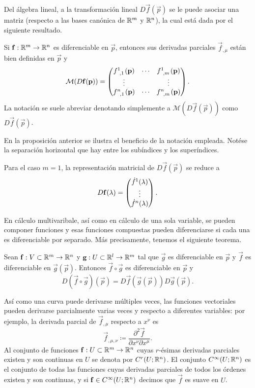 Del álgebra lineal, a la transformación lineal $D\vec f(\vec p)$ se le puede asociar una matriz (respecto a las bases canónica de $\mathbb R^m$ y $\mathbb R^n$), la cual está dada por el siguiente resultado.
\begin{proposition}\label{prop: jacobian}
	Si $\mathbf f: \mathbb R^m \to \mathbb R^n$ es diferenciable en $\vec p$, entonces sus derivadas parciales $\vec f_{,\mu}$ están bien definidas en $\vec p$ y
	\begin{equation}
		\mathcal M(D\vec f(\vec p)) = \Matrix{
			f\indices{^1_{,1}}(\vec p) & \dotsb & f\indices{^1_{,m}}(\vec p)\\
			\vdots & & \vdots\\
			f\indices{^n_{,1}}(\vec p) & \dotsb & f\indices{^n_{,m}}(\vec p)
		}.
	\end{equation}
	La notación se suele abreviar denotando simplemente a $\mathcal M(D\vec f(\vec p))$  como $D\vec f(\vec p) $.
\end{proposition}
En la proposición anterior se ilustra el beneficio de la notación empleada.
Notése la separación horizontal que hay entre los subíndices y los superíndices.
\begin{remark}
	Para el caso $m = 1$, la representación matricial de $D\vec f(\vec p)$ se reduce a
	\begin{equation}
		D\mathbf f(\lambda) = \begin{pmatrix}\dot f^1(\lambda) \\ \vdots \\ \dot f^n(\lambda)\end{pmatrix}.
	\end{equation}
\end{remark}

En cálculo multivaribale, así como en cálculo de una sola variable, se pueden componer funciones y esas funciones compuestas pueden diferenciarse si cada una es diferenciable por separado. Más precisamente, tenemos el siguiente teorema.
\begin{theorem}\label{teo: chain}
	Sean $\mathbf f : V \subset \mathbb R^m \to \mathbb R^n$ y $\mathbf g : U \subset \mathbb R^l \to \mathbb R^m$ tal que $\vec g$ es diferenciable en $\vec p$ y $\vec f$ es diferenciable en $\vec g(\vec p)$. Entonces $\vec f \circ \vec g$ es diferenciable en $\vec p$ y
	\begin{equation}
		D(\vec f \circ \vec g)(\vec p) = D\vec f(\vec g(\vec p)) D\vec g(\vec p).
	\end{equation}
\end{theorem}

Así como una curva puede derivarse múltiples veces, las funciones vectoriales pueden derivarse parcialmente varias veces y respecto a diferentes variables: por ejemplo, la derivada parcial de $\vec f_{,\mu}$ respecto a $x^\nu$ es
\begin{equation}
	\vec f_{,\mu,\nu} \coloneqq \frac{\partial^2 \vec f}{\partial x^\nu \partial x^\mu}.
\end{equation}
Al conjunto de funciones $\mathbf f : U \subset \mathbb R^m \to \mathbb R^n$ cuyas $r$-ésimas derivadas parciales existen y son continuas en $U$ se denota por $C^r(U; \mathbb R^n)$. El conjunto $C^\infty(U; \mathbb R^n)$ es el conjunto de todas las funciones cuyas derivadas parciales de todos los órdenes existen y son continuas, y si $\mathbf f \in C^\infty(U; \mathbb R^n)$ decimos que $\vec f$ es suave en $U$.

